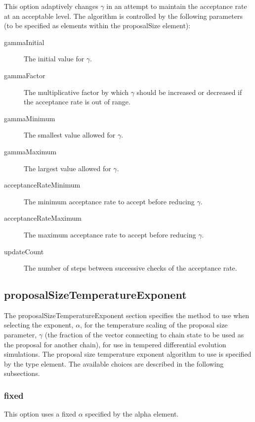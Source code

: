 This option adaptively changes $\gamma$ in an attempt to maintain the acceptance rate at an acceptable level. The algorithm is controlled by the following parameters (to be specified as elements within the {\normalfont \ttfamily proposalSize} element):
\begin{description}
\item[{\normalfont \ttfamily gammaInitial}] The initial value for $\gamma$.
\item[{\normalfont \ttfamily gammaFactor}] The multiplicative factor by which $\gamma$ should be increased or decreased if the acceptance rate is out of range.
\item[{\normalfont \ttfamily gammaMinimum}] The smallest value allowed for $\gamma$.
\item[{\normalfont \ttfamily gammaMaximum}] The largest value allowed for $\gamma$.
\item[{\normalfont \ttfamily acceptanceRateMinimum}] The minimum acceptance rate to accept before reducing $\gamma$.
\item[{\normalfont \ttfamily acceptanceRateMaximum}] The maximum acceptance rate to accept before reducing $\gamma$.
\item[{\normalfont \ttfamily updateCount}] The number of steps between successive checks of the acceptance rate.
\end{description}

\subsection{{\normalfont \ttfamily proposalSizeTemperatureExponent}}

The {\normalfont \ttfamily proposalSizeTemperatureExponent} section specifies the method to use when selecting the exponent, $\alpha$, for the temperature scaling of the proposal size parameter, $\gamma$ (the fraction of the vector connecting to chain state to be used as the proposal for another chain), for use in tempered differential evolution simulations. The proposal size temperature exponent algorithm to use is specified by the {\normalfont \ttfamily type} element. The available choices are described in the following subsections.

\subsubsection{{\normalfont \ttfamily fixed}}

This option uses a fixed $\alpha$ specified by the {\normalfont \ttfamily alpha} element.

